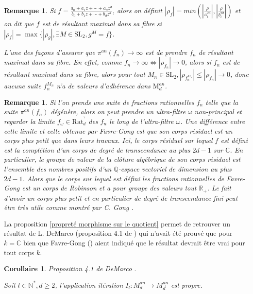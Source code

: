 \documentclass[11pt]{article}
\newcommand{\Q}{\mathbb{Q}}
\newcommand{\R}{\mathbb{R}}
\newcommand{\N}{\mathbb{N}}
\newcommand{\C}{\mathbb{C}}
\newcommand{\Rat}{\mathrm{Rat}}
\newcommand{\SL}{\mathrm{SL}}
\newcommand{\M}{\mathrm{M}}
\newtheorem{rem}[thm]{Remarque}
\newtheorem{cor}[thm]{Corollaire}
\begin{document}
\begin{rem}
Si $f =\frac{a_0 + a_1z+ \cdots + a_dz^d}{b_0 + b_1z + \cdots + b_dz^d}$, alors on définit $|\rho_f| =  min (|\frac{\rho}{a_i^{2d}}|, |\frac{\rho}{b_i^{2d}}|)$ et on dit que $f$ est de résultant maximal dans sa fibre si $|\rho_f| = \max\lbrace |\rho_g|, \exists M\in \SL_2, g^M = f \rbrace$.
 
L'une des façons d'assurer que $\pi^{an}(f_n) \rightarrow \infty$ est de prendre $f_n$ de résultant maximal dans sa fibre. En effet, comme $f_n \rightarrow \infty \iff |\rho_{f_n}|\rightarrow 0$, alors si $f_n$ est de résultant maximal dans sa fibre, alors pour tout $M_n \in \SL_2, |\rho_{f_n^{M_n}}| \leq |\rho_{f_n}| \rightarrow 0$, donc aucune suite $f_n^{M_n}$ n'a de valeurs d'adhérence dans $\M_d^{an}$.  
\end{rem}

\begin{rem}
Si l'on prends une suite de fractions rationnelles $f_n$ telle que la suite $\pi^{an}(f_n)$ dégénère, alors on peut prendre un ultra-filtre $\omega$ non-principal et regarder la limite $f_\omega \in \Rat_d^\urcorner$ des $f_n$ le long de l'ultra-filtre $\omega$. Une différence entre cette limite et celle obtenue par Favre-Gong \cite{FavreGong} est que son corps résiduel est un corps plus petit que dans leurs travaux. Ici, le corps résiduel sur lequel $f$ est défini est la complétion d'un corps de degré de transcendance au plus $2d-1$ sur $\C$. En particulier, le groupe de valeur de la clôture algébrique de son corps résiduel est l'ensemble des nombres positifs d'un $\Q$-espace vectoriel de dimension au plus $2d-1$. Alors que le corps sur lequel est défini les fractions rationnelles de Favre-Gong est un corps de Robinson et a pour groupe des valeurs tout $\R_+$. Le fait d'avoir un corps plus petit et en particulier de degré de transcendance fini peut-être très utile comme montré par C. Gong \cite{GongMultiplierScale}.
\end{rem}

La proposition \ref{propreté morphisme sur le quotient} permet de retrouver un résultat de L. DeMarco (proposition 4.1 de \cite{DeMarcoSpaceQuadraticRationalMaps}) qui n'avait été prouvé que pour $k = \C$ bien que Favre-Gong (\cite{FavreGong}) aient indiqué que le résultat devrait être vrai pour tout corps $k$.

\begin{cor}\label{propreté itération} Proposition 4.1 de DeMarco \cite{DeMarcoSpaceQuadraticRationalMaps}.

Soit $l \in \N^*, d\geq 2$, l'application itération $I_l : M_d^{an} \rightarrow M_{d^l}^{an}$ est propre.
\end{cor}
\end{document}
